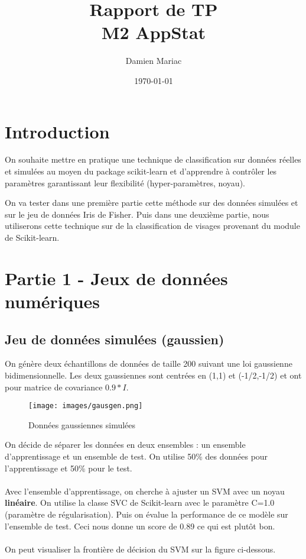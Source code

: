 \documentclass[a4paper, 12pt]{article}
\title{Rapport de TP \\ \large{M2 AppStat}}
\author{Damien Mariac}
\date{\today}
\begin{document}
\maketitle

\newpage

\section*{Introduction}

On souhaite mettre en pratique une technique de classification sur données réelles et
simulées au moyen du package scikit-learn et d’apprendre à contrôler les paramètres garantissant leur flexibilité (hyper-paramètres, noyau).

On va tester dans une première partie cette méthode sur des données simulées et sur le jeu de données Iris de Fisher.
Puis dans une deuxième partie, nous utiliserons cette technique sur de la classification de visages provenant du module de Scikit-learn.

\section*{Partie 1 - Jeux de données numériques}

\subsection*{Jeu de données simulées (gaussien)}

On génère deux échantillons de données de taille 200 suivant une loi gaussienne bidimensionnelle. Les deux gaussiennes sont centrées en (1,1) et (-1/2,-1/2) et ont pour matrice de covariance $0.9 * I$.

\begin{figure}[!htbp]
    \centering
    \texttt{[image: images/gausgen.png]}
    \caption{Données gaussiennes simulées}
    \label{fig:gaussian_data}
\end{figure}

On décide de séparer les données en deux ensembles : un ensemble d'apprentissage et un ensemble de test. On utilise 50\% des données pour l'apprentissage et 50\% pour le test.
\\
\\
Avec l'ensemble d'apprentissage, on cherche à ajuster un SVM avec un noyau \textbf{linéaire}. On utilise la classe SVC de Scikit-learn avec le paramètre C=1.0 (paramètre de régularisation).
Puis on évalue la performance de ce modèle sur l'ensemble de test. Ceci nous donne un score de 0.89 ce qui est plutôt bon.
\\
\\
On peut visualiser la frontière de décision du SVM sur la figure ci-dessous.
\end{document}
